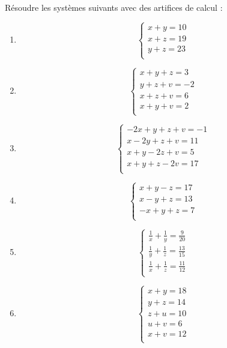 \begin{exercice}
Résoudre les systèmes suivants avec des artifices de calcul : 
\begin{multicols}{2}
\begin{enumerate}
\item $$\left\{ \begin{array}{l}
    x+y=10 \\ 
   x+z=19 \\ 
   y+z=23 \\ 
\end{array} \right.$$

\item $$\left\{ \begin{array}{l}
    x+y+z=3 \\ 
   y+z+v=-2 \\ 
   x+z+v=6 \\ 
   x+y+v=2 \\ 
\end{array} \right.$$

\item $$\left\{ \begin{array}{l}
    -2x+y+z+v=-1 \\ 
   x-2y+z+v=11 \\ 
   x+y-2z+v=5 \\ 
   x+y+z-2v=17 \\ 
\end{array} \right.$$

\item $$\left\{ \begin{array}{l}
    x+y-z=17 \\ 
   x-y+z=13 \\ 
   -x+y+z=7 \\ 
\end{array} \right.$$

\item $$\left\{ \begin{array}{l}
    \frac{1}{x}+\frac{1}{y}=\frac{9}{20} \\ 
   \frac{1}{y}+\frac{1}{z}=\frac{13}{15} \\ 
   \frac{1}{x}+\frac{1}{z}=\frac{11}{12} \\ 
\end{array} \right.$$

\item $$\left\{ \begin{array}{l}
    x+y=18 \\ 
   y+z=14 \\ 
   z+u=10 \\ 
   u+v=6 \\ 
   x+v=12 \\ 
\end{array} \right.$$
\end{enumerate}
\end{multicols}
\end{exercice}

